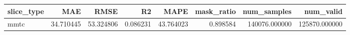 \begin{tabular}{lrrrrrrr}
\toprule
slice_type & MAE & RMSE & R2 & MAPE & mask_ratio & num_samples & num_valid \\
\midrule
mmtc & 34.710445 & 53.324806 & 0.086231 & 43.764023 & 0.898584 & 140076.000000 & 125870.000000 \\
\bottomrule
\end{tabular}
